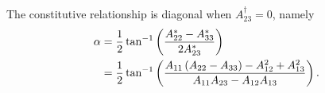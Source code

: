 The constitutive relationship is diagonal when $A_{23}^{\dagger}=0$, namely
\begin{align}
	\alpha &= \frac{1}{2} \tan^{-1}\left( 
		\frac{A_{22}^* - A_{33}^*}{2 A_{23}^*}
	 \right)
	\nonumber \\
	&= \frac{1}{2} \tan^{-1}\left( 
		\frac{A_{11}\left( A_{22} - A_{33} \right) - A_{12}^2 + A_{13}^2}{A_{11} A_{23} - A_{12} A_{13}}
	 \right)
	.
\end{align}





















